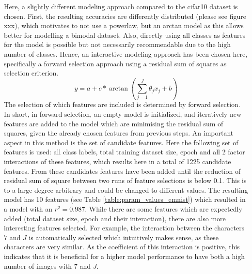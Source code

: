 \documentclass{article} %
\begin{document}
Here, a slightly different modeling approach compared to the cifar10 dataset is chosen. 
First, the resulting accuracies are differently distributed (please see figure xxx), which motivates to not use a powerlaw, but an arctan model as this allows better for modelling a bimodal dataset.
Also, directly using all classes as features for the model is possible but not necessarily recommendable due to the high number of classes.
Hence, an interactive modeling approach has been chosen here, specifically a forward selection approach using a residual sum of squares as selection criterion. 
$$y = a + c* \arctan{\left(\sum_{j = 1}^{J}{\theta_j x_j} + b \right)}$$
The selection of which features are included is determined by forward selection. In short, in forward selection, an empty model is initialized, and iteratively new features are added to the model which are minimising the residual sum of squares, given the already chosen features from previous steps.
An important aspect in this method is the set of candidate features. Here the following set of features is used: all class labels, total training dataset size, epoch and all 2 factor interactions of these features, which results here in a total of 1225 candidate features.
From these candidates features have been added until the reduction of residual sum of square between two runs of feature selections is below 0.1.
This is to a large degree arbitrary and could be changed to different values.  
The resulting model has 10 features (see Table \ref{table:param_values_emnist}) which resulted in a model with an $r^2 = 0.987$. While there are some features which are expectedly added (total dataset size, epoch and their interaction), there are also more interesting features selected.
For example, the interaction between the characters $7$ and $J$ is automatically selected which intuitively makes sense, as these characters are very similar. As the coefficient of this interaction is positive, this indicates that it is beneficial for a higher model performance to have both a high number of images with $7$ and $J$.
\end{document}
